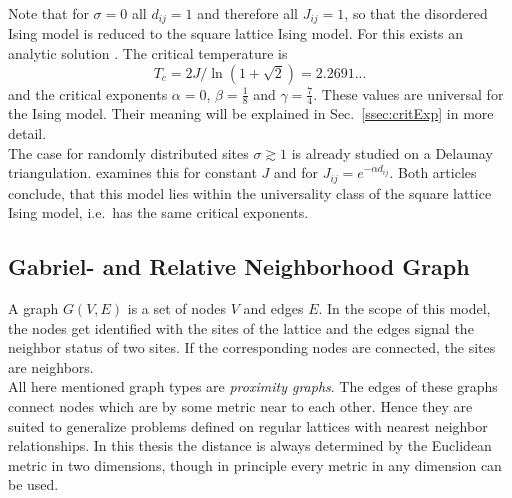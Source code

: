     Note that for \(\sigma = 0\) all \(d_{ij} = 1\) and therefore all
    \(J_{ij} = 1\), so that the disordered Ising model is reduced to the
    square lattice Ising model. For this exists an analytic solution \cite{Onsager1944}.
    The critical temperature is
    \begin{equation}
        T_c = 2J/\ln(1+\sqrt 2) = 2.2691...
        \label{eq:exactTc}
    \end{equation}
    and the critical exponents \(\alpha = 0\), \(\beta = \frac{1}{8}\)
    and \(\gamma = \frac{7}{4}\). These values are universal for the Ising
    model. Their meaning will be explained in Sec.\ \ref{ssec:critExp} in more detail.\\
    The case for randomly distributed sites \(\sigma \gtrsim 1\) is
    already studied on a Delaunay triangulation. \cite{Janke1994} examines
    this for constant \(J\) and \cite{Lima2000} for \(J_{ij} = e^{-\alpha d_{ij}}\).
    Both articles conclude, that this model lies within the universality
    class of the square lattice Ising model, i.e.\ has the same critical
    exponents.

\subsection{Gabriel- and Relative Neighborhood Graph}
\label{ssec:graphtypes}
    A graph \(G(V,E)\) is a set of nodes \(V\) and edges \(E\). In the
    scope of this model, the nodes get identified with the sites of the
    lattice and the edges signal the neighbor status of two sites. If the
    corresponding nodes are connected, the sites are neighbors.\\
    All here mentioned graph types are \emph{proximity graphs}.
    The edges of these graphs connect nodes which are by some metric near
    to each other.
    Hence they are suited to generalize problems defined on regular
    lattices with nearest neighbor relationships.
    In this thesis the distance is always determined by the Euclidean
    metric in two dimensions, though in principle every metric in any
    dimension can be used.\\

